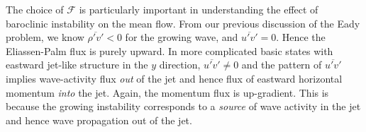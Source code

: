 \documentclass{jknotes}
\begin{document}
The choice of $\mathcal{F}$ is particularly important in understanding the
effect of baroclinic instability on the mean flow. From our previous
discussion of the Eady problem, we know $\overline{\rho'v'} < 0$ for the
growing wave, and $\overline{u'v'} = 0$. Hence the Eliassen-Palm flux is
purely upward. In more complicated basic states with eastward jet-like
structure in the $y$ direction, $\overline{u'v'} \ne 0$ and the pattern of
$\overline{u'v'}$ implies wave-activity flux \emph{out} of the jet and hence
flux of eastward horizontal momentum \emph{into} the jet. Again, the momentum
flux is up-gradient. This is because the growing instability corresponds to a
\emph{source} of wave activity in the jet and hence wave propagation out of
the jet.
\end{document}
